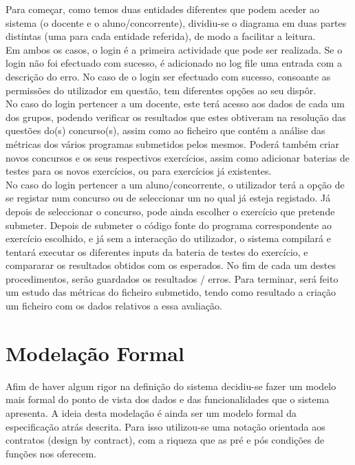 Para começar, como temos duas entidades diferentes que podem aceder ao sistema (o docente e o aluno/concorrente), 
dividiu-se o diagrama em duas partes distintas (uma para cada entidade referida), de modo a facilitar a leitura.\\

Em ambos os casos, o login é a primeira actividade que pode ser realizada.
Se o login não foi efectuado com sucesso, é adicionado no log file uma entrada com a descrição do erro.
No caso de o login ser efectuado com sucesso, consoante as permissões do utilizador em questão, tem diferentes opções ao seu dispôr.\\

No caso do login pertencer a um docente, este terá acesso aos dados de cada um dos grupos, podendo verificar os resultados que estes 
obtiveram na resolução das questões do(s) concurso(s), assim como ao ficheiro que contém a análise das métricas dos vários programas submetidos 
pelos mesmos.
Poderá também criar novos concursos e os seus respectivos exercícios, assim como adicionar baterias de testes para os novos exercícios, 
ou para exercícios já existentes.\\

No caso do login pertencer a um aluno/concorrente, o utilizador terá a opção de se registar num concurso ou de seleccionar um no qual já 
esteja registado.
Já depois de seleccionar o concurso, pode ainda escolher o exercício que pretende submeter.
Depois de submeter o código fonte do programa correspondente ao exercício escolhido, e já sem a interacção do utilizador, 
o sistema compilará e tentará executar os diferentes inputs da bateria de testes do exercício, e compararar os resultados obtidos com os esperados.
No fim de cada um destes procedimentos, serão guardados os resultados / erros.
Para terminar, será feito um estudo das métricas do ficheiro submetido, tendo como resultado a criação um ficheiro com os dados relativos a essa avaliação.\\

\section{Modelação Formal}\label{sec modfor}

Afim de haver algum rigor na definição do sistema decidiu-se fazer um modelo mais formal do ponto de vista dos dados e das funcionalidades que o sistema apresenta.
A ideia desta modelação é ainda ser um modelo formal da especificação atrás descrita. Para isso utilizou-se uma notação orientada aos contratos (design by contract),
com a riqueza que as pré e pós condições de funções nos oferecem.\\

